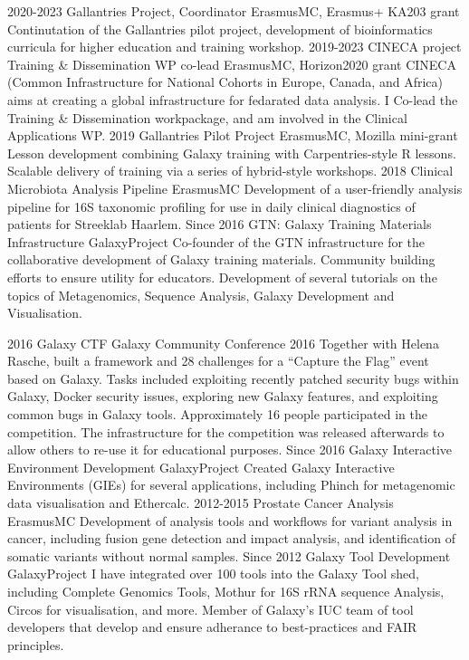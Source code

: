 \documentclass[]{shiltemann-cv}
\begin{document}
\begin{entrylist}
   \entry
    {2020-2023}
    {Gallantries Project, Coordinator}
    {ErasmusMC, Erasmus+ KA203 grant}
    {Continutation of the Gallantries pilot project, development of bioinformatics curricula for higher education and training workshop.}
   \entry
    {2019-2023}
    {CINECA project Training \& Dissemination WP co-lead}
    {ErasmusMC, Horizon2020 grant}
    {CINECA (Common Infrastructure for National Cohorts in Europe, Canada, and Africa) aims at creating a global infrastructure for fedarated data analysis. I Co-lead the Training \& Dissemination  workpackage, and am involved in the Clinical Applications WP.}
   \entry
    {2019}
    {Gallantries Pilot Project}
    {ErasmusMC, Mozilla mini-grant}
    {Lesson development combining Galaxy training with Carpentries-style R lessons. Scalable delivery of training via a series of hybrid-style workshops.}
  \entry
    {2018}
    {Clinical Microbiota Analysis Pipeline}
    {ErasmusMC}
    {Development of a user-friendly analysis pipeline for 16S taxonomic profiling for use in daily clinical diagnostics of patients for Streeklab Haarlem.}
  \entry
    {Since 2016}
    {GTN: Galaxy Training Materials Infrastructure}
    {GalaxyProject}
    {Co-founder of the GTN infrastructure for the collaborative development of Galaxy training materials. Community building efforts to ensure utility for educators.  Development of several tutorials on the topics of Metagenomics, Sequence Analysis, Galaxy Development and Visualisation.  }


  \entry
    {2016}
    {Galaxy CTF}
    {Galaxy Community Conference 2016}
    {Together with Helena Rasche, built a framework and 28 challenges for a “Capture the Flag” event based on Galaxy. Tasks included exploiting recently patched security bugs within Galaxy, Docker security issues, exploring new Galaxy features, and exploiting common bugs in Galaxy tools. Approximately 16 people participated in the competition. The infrastructure for the competition was released afterwards to allow others to re-use it for educational purposes.}
   \entry
     {Since 2016}
     {Galaxy Interactive Environment Development}
     {GalaxyProject}
     {Created Galaxy Interactive Environments (GIEs) for several applications, including Phinch for metagenomic data visualisation and Ethercalc.}
   \entry
     {2012-2015}
     {Prostate Cancer Analysis}
     {ErasmusMC}
     {Development of analysis tools and workflows for variant analysis in cancer, including fusion gene detection and impact analysis, and identification of somatic variants without normal samples.}
   \entry
    {Since 2012}
    {Galaxy Tool Development}
    {GalaxyProject}
    {I have integrated over 100 tools into the Galaxy Tool shed, including Complete Genomics Tools, Mothur for 16S rRNA sequence Analysis, Circos for visualisation, and more. Member of Galaxy's IUC team of tool developers that develop and ensure adherance to best-practices and FAIR principles.}
\end{entrylist}
\newpage
\end{document}
